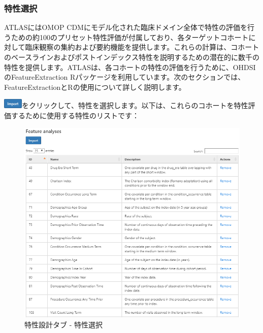 \documentclass[
  11pt]{book}
\theoremstyle{definition}
\theoremstyle{definition}
\theoremstyle{definition}
\theoremstyle{definition}
\theoremstyle{remark}
\begin{document}
\subsubsection*{特性選択}\label{ux7279ux6027ux9078ux629e}

ATLASにはOMOP CDMにモデル化された臨床ドメイン全体で特性の評価を行うための約100のプリセット特性評価が付属しており、各ターゲットコホートに対して臨床観察の集約および要約機能を提供します。これらの計算は、コホートのベースラインおよびポストインデックス特性を説明するための潜在的に数千の特性を提供します。ATLASは、各コホートの特性の評価を行うために、OHDSIのFeatureExtraction Rパッケージを利用しています。次のセクションでは、FeatureExtractionとRの使用について詳しく説明します。

\includegraphics{images/Characterization/atlasImportButton.png}をクリックして、特性を選択します。以下は、これらのコホートを特性評価するために使用する特性のリストです：

\begin{figure}

{\centering \includegraphics[width=1\linewidth]{images/Characterization/atlasCharacterizationFeatureSelection} 

}

\caption{特性設計タブ - 特性選択}\label{fig:atlasCharacterizationFeatureSelection}
\end{figure}
\end{document}
